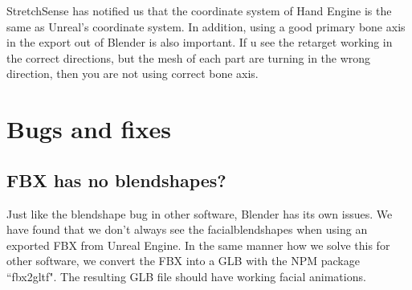 \documentclass{uva-inf-article}
\begin{document}
StretchSense has notified us that the coordinate system of Hand Engine is the same as Unreal's coordinate system. In addition, using a good primary bone axis in the export out of Blender is also important. If u see the retarget working in the correct directions, but the mesh of each part are turning in the wrong direction, then you are not using correct bone axis.

\section{Bugs and fixes}
\subsection{FBX has no blendshapes?}
Just like the blendshape bug in other software, Blender has its own issues. We have found that we don't always see the facialblendshapes when using an exported FBX from Unreal Engine. In the same manner how we solve this for other software, we convert the FBX into a GLB with the NPM package ``fbx2gltf". The resulting GLB file should have working facial animations.
\end{document}
